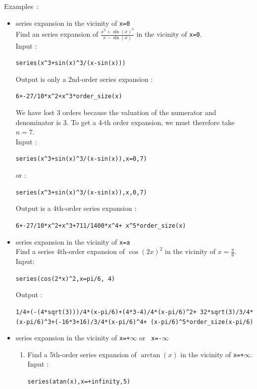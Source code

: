 \documentclass[a4paper,11pt]{book}
\begin{document}
Examples~:
\begin{itemize}
\item  series expansion in the vicinity of {\tt x=0}\\
 Find an series expansion of 
$\displaystyle\frac{x^3+\sin(x)^3}{x-\sin(x)}$ 
in the vicinity of {\tt x=0}.\\
Input :
\begin{center}{\tt series(x\verb|^|3+sin(x)\verb|^|3/(x-sin(x)))}\end{center}
Output is only a 2nd-order series expansion :
\begin{center}{\tt 6+-27/10*x\verb|^2|+x\verb|^|3*order\_size(x)}\end{center}
We have lost 3 orders because the valuation of the numerator and
denominator is 3. To get a 4-th order expansion, we must therefore 
take $n=7$.\\
Input :
\begin{center}{\tt series(x\verb|^|3+sin(x)\verb|^|3/(x-sin(x)),x=0,7)}\end{center}
or :
\begin{center}{\tt series(x\verb|^|3+sin(x)\verb|^|3/(x-sin(x)),x,0,7)}\end{center}
Output is a 4th-order series expansion :
\begin{center}{\tt 6+-27/10*x\verb|^|2+x\verb|^|3+711/1400*x\verb|^|4+
x\verb|^|5*order\_size(x)}\end{center}
\item  series expansion in the vicinity of {\tt x=a}\\
Find a series 4th-order expansion of $\cos(2x)^2$ in the vicinity of
$x=\frac{\pi}{6}$. \\
Input:
\begin{center}{\tt series(cos(2*x)\verb|^|2,x=pi/6, 4)}\end{center}
Output :
\begin{center}{\tt 1/4+(-(4*sqrt(3)))/4*(x-pi/6)+(4*3-4)/4*(x-pi/6)\verb|^|2+ 32*sqrt(3)/3/4*(x-pi/6)\verb|^|3+(-16*3+16)/3/4*(x-pi/6)\verb|^|4+ (x-pi/6)\verb|^|5*order\_size(x-pi/6)}\end{center} 
\item  series expansion in the vicinity of {\tt x=+$\infty$} or  {\tt
    x=-$\infty$}
\begin{enumerate}
\item 
Find a 5th-order series expansion of $\arctan(x)$ in the vicinity of
{\tt x=+$\infty$}.\\
 Input :
\begin{center}{\tt series(atan(x),x=+infinity,5)}\end{center}

\end{enumerate}
\end{itemize}
\end{document}

